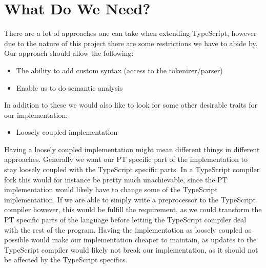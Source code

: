 
\section{What Do We Need?}\label{sec:what-do-we-need}

There are a lot of approaches one can take when extending TypeScript, however due to the nature of this project there are some restrictions we have to abide by.
Our approach should allow the following:

\begin{itemize}
    \item The ability to add custom syntax (access to the tokenizer/parser)
    \item Enable us to do semantic analysis
\end{itemize}

In addition to these we would also like to look for some other desirable traits for our implementation:

\begin{itemize}
    \item Loosely coupled implementation
\end{itemize}

Having a loosely coupled implementation might mean different things in different approaches.
Generally we want our PT specific part of the implementation to stay loosely coupled with the TypeScript specific parts.
In a TypeScript compiler fork this would for instance be pretty much unachievable, since the PT implementation would likely have to change some of the TypeScript implementation.
If we are able to simply write a preprocessor to the TypeScript compiler however, this would be fulfill the requirement, as we could transform the PT specific parts of the language before letting the TypeScript compiler deal with the rest of the program.
Having the implementation as loosely coupled as possible would make our implementation cheaper to maintain, as updates to the TypeScript compiler would likely not break our implementation, as it should not be affected by the TypeScript specifics.

